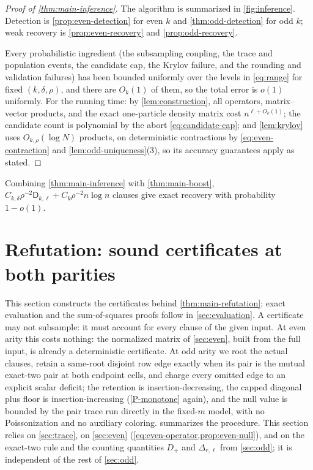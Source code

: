 \documentclass[11pt]{article}
\theoremstyle{definition}
\theoremstyle{remark}
\newcommand{\1}{\mathbf 1}
\newcommand{\Dkl}{\mathsf D_{k,\ell}}
\numberwithin{equation}{section}
\begin{document}
\begin{proof}[Proof of \cref{thm:main-inference}]
The algorithm is summarized in \cref{fig:inference}.  Detection is
\cref{prop:even-detection} for even $k$ and \cref{thm:odd-detection} for
odd $k$; weak recovery is \cref{prop:even-recovery} and
\cref{prop:odd-recovery}.

Every probabilistic ingredient (the subsampling coupling, the trace and
population events, the candidate cap, the Krylov failure, and the
rounding and validation failures) has been bounded uniformly over the
levels in \cref{eq:range} for fixed $(k,\delta,\rho)$, and there are
$O_k(1)$ of them, so the total error is $o(1)$ uniformly.  For the
running time: by \cref{lem:construction}, all operators, matrix--vector
products, and the exact one-particle density matrix cost
$n^{\ell+O_k(1)}$; the candidate count is polynomial by the abort
\cref{eq:candidate-cap}; and \cref{lem:krylov} uses
$O_{k,\rho}(\log N)$ products, on deterministic contractions by
\cref{eq:even-contraction} and \cref{lem:odd-uniqueness}(3), so its
accuracy guarantees apply as stated.
\end{proof}

Combining \cref{thm:main-inference} with \cref{thm:main-boost},
$C_{k,\delta}\rho^{-2}\Dkl+C_k\rho^{-2}n\log n$ clauses give exact
recovery with probability $1-o(1)$.

\section{Refutation: sound certificates at both parities}
\label{sec:refutation}

This section constructs the certificates behind
\cref{thm:main-refutation}; exact evaluation and the sum-of-squares
proofs follow in \cref{sec:evaluation}.  A certificate may not
subsample: it must account for every clause of the given input.  At
even arity this costs nothing: the normalized matrix of
\cref{sec:even}, built from the full input, is already a deterministic
certificate.  At odd arity we root the actual clauses, retain a
same-root disjoint row edge exactly when its pair is the mutual
exact-two pair at both endpoint cells, and charge every omitted edge to
an explicit scalar deficit; the retention is insertion-decreasing, the
capped diagonal plus floor is insertion-increasing (\ref{P-monotone}
again), and the null value is bounded by the pair trace run directly in
the fixed-$m$ model, with no Poissonization and no auxiliary coloring.
 summarizes the procedure.  This section relies on
\cref{sec:trace}, on \cref{sec:even}
(\cref{eq:even-operator,prop:even-null}), and on the exact-two rule and
the counting quantities $D_+$ and $\Delta_{r,\ell}$ from
\cref{sec:odd}; it is independent of the rest of \cref{sec:odd}.
\end{document}
